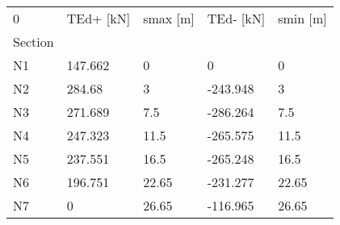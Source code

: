 \begin{tabular}{lllll}
\toprule
0 & TEd+ [kN] & smax [m] & TEd- [kN] & smin [m] \\
Section &           &          &           &          \\
\midrule
N1      &   147.662 &        0 &         0 &        0 \\
N2      &    284.68 &        3 &  -243.948 &        3 \\
N3      &   271.689 &      7.5 &  -286.264 &      7.5 \\
N4      &   247.323 &     11.5 &  -265.575 &     11.5 \\
N5      &   237.551 &     16.5 &  -265.248 &     16.5 \\
N6      &   196.751 &    22.65 &  -231.277 &    22.65 \\
N7      &         0 &    26.65 &  -116.965 &    26.65 \\
\bottomrule
\end{tabular}
